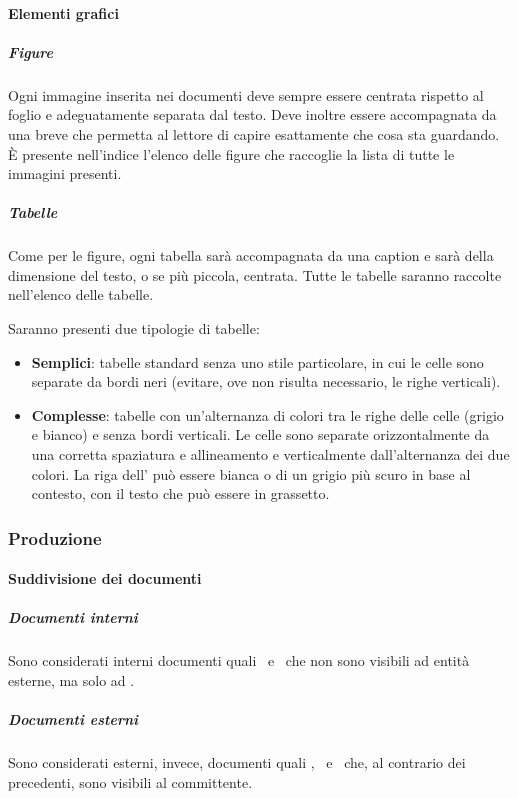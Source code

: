 			\paragraph{Elementi grafici}

			\subparagraph{Figure}
			Ogni immagine inserita nei documenti deve sempre essere centrata rispetto al foglio e adeguatamente separata dal testo. Deve inoltre essere
			accompagnata da una breve  che permetta al lettore di capire esattamente che cosa sta guardando.\\
			È presente nell'indice l'elenco delle figure che raccoglie la lista di tutte le immagini presenti.

			\subparagraph{Tabelle}
			Come per le figure, ogni tabella sarà accompagnata da una caption e sarà della dimensione del testo, o se più piccola, centrata.
			Tutte le tabelle saranno raccolte nell'elenco delle tabelle.\par
			Saranno presenti due tipologie di tabelle:
			\begin{itemize}
				\item \textbf{Semplici}: tabelle standard senza uno stile particolare, in cui le celle sono separate da bordi neri (evitare, ove non risulta necessario,
					le righe verticali).
				\item \textbf{Complesse}: tabelle con un'alternanza di colori tra le righe delle celle (grigio e bianco) e senza bordi verticali.
					Le celle sono separate orizzontalmente da una corretta spaziatura e allineamento e verticalmente dall'alternanza dei due colori.
					La riga dell' può essere bianca o di un grigio più scuro in base al contesto, con il testo che può essere in grassetto.
			\end{itemize}


		\subsubsection{Produzione}

			\paragraph{Suddivisione dei documenti}

			\subparagraph{Documenti interni}
			Sono considerati interni documenti quali \SdF\ e \NdP\ che non sono visibili ad entità esterne, ma solo ad \gruppo.

			\subparagraph{Documenti esterni}
			Sono considerati esterni, invece, documenti quali \PdP, \PdQ\ e \AdR\ che, al contrario dei precedenti, sono visibili al committente.
			
